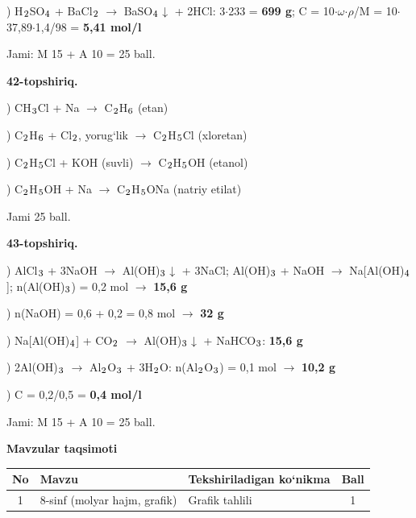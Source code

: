 \documentclass[11pt,a4paper]{article}
\renewcommand{\textsubscript}[1]{\ensuremath{_{\text{\fontsize{8}{8}\selectfont #1}}}}
\begin{document}
) H\textsubscript{2}SO\textsubscript{4} + BaCl\textsubscript{2} $\to$ BaSO\textsubscript{4}$\downarrow$ + 2HCl: 3$\cdot$233 = \textbf{699 g}; C = 10$\cdot$$\omega$$\cdot$$\rho$/M = 10$\cdot$37,89$\cdot$1,4/98 = \textbf{5,41 mol/l}\par
\noindent Jami: M 15 + A 10 = 25 ball.\par
\noindent\textbf{42-topshiriq.}\par
{}) CH\textsubscript{3}Cl + Na $\to$ C\textsubscript{2}H\textsubscript{6} (etan)\par
{}) C\textsubscript{2}H\textsubscript{6} + Cl\textsubscript{2}, yorug`lik $\to$ C\textsubscript{2}H\textsubscript{5}Cl (xloretan)\par
{}) C\textsubscript{2}H\textsubscript{5}Cl + KOH (suvli) $\to$ C\textsubscript{2}H\textsubscript{5}OH (etanol)\par
{}) C\textsubscript{2}H\textsubscript{5}OH + Na $\to$ C\textsubscript{2}H\textsubscript{5}ONa (natriy etilat)\par
\noindent Jami 25 ball.\par
\noindent\textbf{43-topshiriq.}\par
{}) AlCl\textsubscript{3} + 3NaOH $\to$ Al(OH)\textsubscript{3}$\downarrow$ + 3NaCl; Al(OH)\textsubscript{3} + NaOH $\to$ Na[Al(OH)\textsubscript{4}]; n(Al(OH)\textsubscript{3}) = 0,2 mol $\to$ \textbf{15,6 g}\par
{}) n(NaOH) = 0,6 + 0,2 = 0,8 mol $\to$ \textbf{32 g}\par
{}) Na[Al(OH)\textsubscript{4}] + CO\textsubscript{2} $\to$ Al(OH)\textsubscript{3}$\downarrow$ + NaHCO\textsubscript{3}: \textbf{15,6 g}\par
{}) 2Al(OH)\textsubscript{3} $\to$ Al\textsubscript{2}O\textsubscript{3} + 3H\textsubscript{2}O: n(Al\textsubscript{2}O\textsubscript{3}) = 0,1 mol $\to$ \textbf{10,2 g}\par
{}) C = 0,2/0,5 = \textbf{0,4 mol/l}\par
\noindent Jami: M 15 + A 10 = 25 ball.\par
\par\bigskip\noindent\textbf{Mavzular taqsimoti}\par\smallskip
{\small\noindent\begin{longtable}{|c|p{7.2cm}|p{5.4cm}|c|}\hline \textbf{No} & \textbf{Mavzu} & \textbf{Tekshiriladigan ko`nikma} & \textbf{Ball}\\\hline
1 & 8-sinf (molyar hajm, grafik) & Grafik tahlili & 1\\\hline

\end{longtable}}$$
\end{document}
